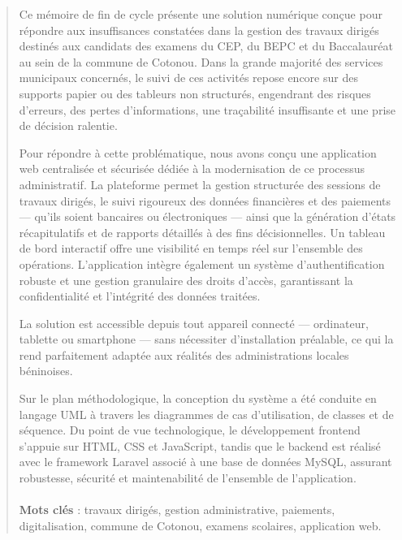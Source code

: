 \resume
{}
\begin{abstract}
Ce mémoire de fin de cycle présente une solution numérique conçue pour répondre aux insuffisances constatées dans la gestion des travaux dirigés destinés aux candidats des examens du CEP, du BEPC et du Baccalauréat au sein de la commune de Cotonou. Dans la grande majorité des services municipaux concernés, le suivi de ces activités repose encore sur des supports papier ou des tableurs non structurés, engendrant des risques d'erreurs, des pertes d'informations, une traçabilité insuffisante et une prise de décision ralentie.

Pour répondre à cette problématique, nous avons conçu une application web centralisée et sécurisée dédiée à la modernisation de ce processus administratif. La plateforme permet la gestion structurée des sessions de travaux dirigés, le suivi rigoureux des données financières et des paiements --- qu'ils soient bancaires ou électroniques --- ainsi que la génération d'états récapitulatifs et de rapports détaillés à des fins décisionnelles. Un tableau de bord interactif offre une visibilité en temps réel sur l'ensemble des opérations. L'application intègre également un système d'authentification robuste et une gestion granulaire des droits d'accès, garantissant la confidentialité et l'intégrité des données traitées.

La solution est accessible depuis tout appareil connecté --- ordinateur, tablette ou smartphone --- sans nécessiter d'installation préalable, ce qui la rend parfaitement adaptée aux réalités des administrations locales béninoises.

Sur le plan méthodologique, la conception du système a été conduite en langage UML à travers les diagrammes de cas d'utilisation, de classes et de séquence. Du point de vue technologique, le développement frontend s'appuie sur HTML, CSS et JavaScript, tandis que le backend est réalisé avec le framework Laravel associé à une base de données MySQL, assurant robustesse, sécurité et maintenabilité de l'ensemble de l'application.

\paragraph{}
\textbf{Mots clés} : travaux dirigés, gestion administrative, paiements, digitalisation, commune de Cotonou, examens scolaires, application web.
\end{abstract}

